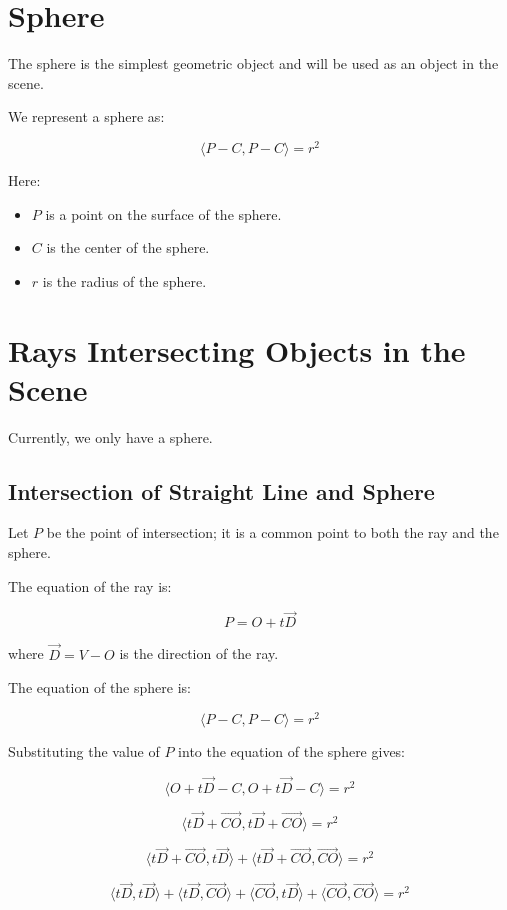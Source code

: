 \documentclass{article}
\begin{document}
\section{Sphere}

The sphere is the simplest geometric object and will be used as an object in the scene.

We represent a sphere as:

$$\langle P - C, P - C \rangle = r^2$$

Here:
\begin{itemize}
    \item $P$ is a point on the surface of the sphere.
    \item $C$ is the center of the sphere.
    \item $r$ is the radius of the sphere.
\end{itemize}

\section{Rays Intersecting Objects in the Scene}

Currently, we only have a sphere.

\subsection{Intersection of Straight Line and Sphere}

Let $P$ be the point of intersection; it is a common point to both the ray and the sphere.

The equation of the ray is:

$$P = O + t \vec{D}$$

where $\vec{D} = V - O$ is the direction of the ray.

The equation of the sphere is:

$$\langle P - C, P - C \rangle = r^2$$

Substituting the value of $P$ into the equation of the sphere gives:

$$\langle O + t \vec{D} - C, O + t \vec{D} - C \rangle = r^2$$

$$\langle t \vec{D} + \vec{CO}, t \vec{D} + \vec{CO} \rangle = r^2$$

$$\langle t \vec{D} + \vec{CO}, t \vec{D} \rangle + \langle t \vec{D} + \vec{CO}, \vec{CO} \rangle = r^2$$

$$\langle t \vec{D}, t \vec{D} \rangle + \langle t \vec{D}, \vec{CO} \rangle + \langle \vec{CO}, t \vec{D} \rangle + \langle \vec{CO}, \vec{CO} \rangle = r^2$$
\end{document}
